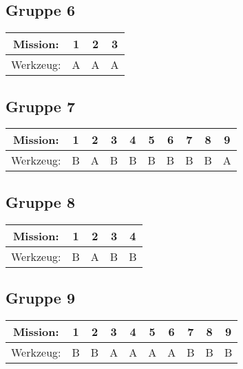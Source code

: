 \documentclass[]{article}
\begin{document}
\subsection*{Gruppe 6}
\begin{tabular}{|c|c|c|c|}
\hline
Mission: & 1 & 2 & 3\\
\hline
Werkzeug: & A & A & A\\
\hline
\end{tabular}


\subsection*{Gruppe 7}
\begin{tabular}{|c|c|c|c|c|c|c|c|c|c|}
\hline
Mission: & 1 & 2 & 3 & 4 & 5 & 6 & 7 & 8 & 9\\
\hline
Werkzeug: & B & A & B & B & B & B & B & B & A\\
\hline
\end{tabular}


\subsection*{Gruppe 8}
\begin{tabular}{|c|c|c|c|c|}
\hline
Mission: & 1 & 2 & 3 & 4\\
\hline
Werkzeug: & B & A & B & B\\
\hline
\end{tabular}


\subsection*{Gruppe 9}
\begin{tabular}{|c|c|c|c|c|c|c|c|c|c|}
\hline
Mission: & 1 & 2 & 3 & 4 & 5 & 6 & 7 & 8 & 9\\
\hline
Werkzeug: & B & B & A & A & A & A & B & B & B\\
\hline
\end{tabular}
\end{document}
